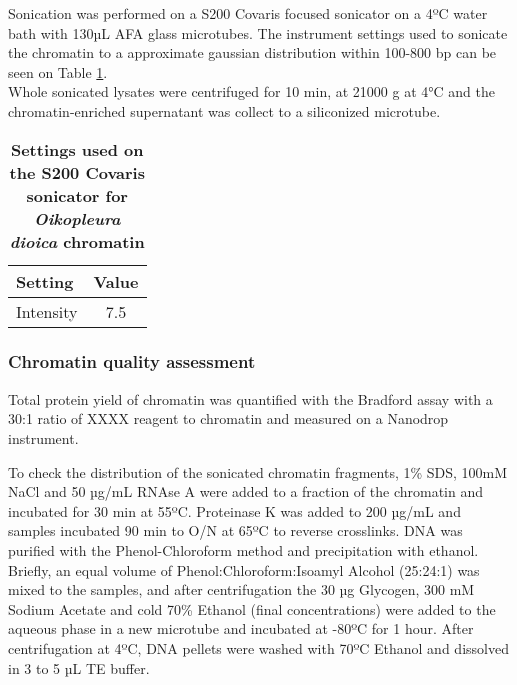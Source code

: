 \documentclass[11pt,twoside,a4paper]{report}
\begin{document}
			Sonication was performed on a S200 Covaris focused sonicator on a 4ºC water bath with 130µL AFA glass microtubes. The instrument settings used to sonicate the chromatin to a approximate gaussian distribution within 100-800 bp can be seen on Table \ref{table:CovarisSettings}. \\
			Whole sonicated lysates were centrifuged for 10 min, at 21000 g at 4°C and the chromatin-enriched supernatant was collect to a siliconized microtube.
			
			\begin{table}[!ht]
        		\caption{
	            \bf{Settings used on the S200 Covaris sonicator for \textit{Oikopleura dioica} chromatin}
    		    }
        		\begin{center}
        		\begin{tabular}{|l|c|}
            		\hline
	            Setting & Value\\
        		    \hline
            	    Intensity & 7.5\\
	        		\hline
	        \end{tabular}
    		    \end{center}
	        \label{table:CovarisSettings}
		    \end{table}
			
			\subsubsection{Chromatin quality assessment}
			\label{section:chromQualityAssess}
			Total protein yield of chromatin was quantified with the Bradford assay with a 30:1 ratio of XXXX reagent to chromatin and measured on a Nanodrop instrument.
			
			To check the distribution of the sonicated chromatin fragments, 1\% SDS, 100mM NaCl and 50 µg/mL RNAse A were added to a fraction of the chromatin and incubated for 30 min at 55ºC. Proteinase K was added to 200 µg/mL and samples incubated 90 min to O/N at 65ºC to reverse crosslinks. DNA was purified with the Phenol-Chloroform method and precipitation with ethanol. Briefly, an equal volume of Phenol:Chloroform:Isoamyl Alcohol (25:24:1) was mixed to the samples, and after centrifugation the 30 µg Glycogen, 300 mM Sodium Acetate and cold 70\% Ethanol (final concentrations) were added to the aqueous phase in a new microtube and incubated at -80ºC for 1 hour. After centrifugation at 4ºC, DNA pellets were washed with 70ºC Ethanol and dissolved in 3 to 5 µL TE buffer. \\
			
\end{document}
